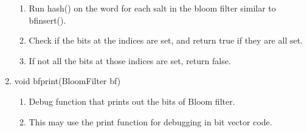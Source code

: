\documentclass[11pt]{article}
\begin{document}
\begin{enumerate}
	\begin{enumerate}
	\item Run hash() on the word for each salt in the bloom filter similar to bfinsert().
	\item Check if the bits at the indices are set, and return true if they are all set.
	\item If not all the bits at those indices are set, return false.
	\end{enumerate}
\item void bfprint(BloomFilter bf)
	\begin{enumerate}
	\item Debug function that prints out the bits of Bloom filter.
	\item This may use the print function for debugging in bit vector code.
	\end{enumerate}
\end{enumerate}
\end{document}
